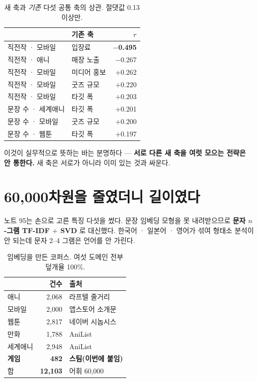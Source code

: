 \documentclass[10pt]{article}
\begin{document}
\begin{table}[t]
\centering\tsize
\caption{새 축과 \emph{기존} 다섯 공통 축의 상관. 절댓값 0.13 이상만.}
\begin{tabular}{llr}
\toprule
& 기존 축 & $r$ \\
\midrule
직전작 · 모바일 & 입장료 & \textbf{$-$0.495} \\
직전작 · 애니 & 매장 노출 & $-$0.267 \\
직전작 · 모바일 & 미디어 홍보 & $+$0.262 \\
직전작 · 모바일 & 굿즈 규모 & $+$0.220 \\
직전작 · 모바일 & 타깃 폭 & $+$0.203 \\
문장 수 · 세계애니 & 타깃 폭 & $+$0.201 \\
문장 수 · 모바일 & 굿즈 규모 & $+$0.200 \\
문장 수 · 웹툰 & 타깃 폭 & $+$0.197 \\
\bottomrule
\end{tabular}
\end{table}


이것이 실무적으로 뜻하는 바는 분명하다 --- \textbf{서로 다른 새 축을 여럿
모으는 전략은 안 통한다.} 새 축은 서로가 아니라 이미 있는 것과 싸운다.

\section{60,000차원을 줄였더니 길이였다}

노트 95는 손으로 고른 특징 다섯을 썼다. 문장 임베딩 모형을 못 내려받으므로
\textbf{문자 $n$-그램 TF-IDF $+$ SVD} 로 대신했다. 한국어 · 일본어 · 영어가
섞여 형태소 분석이 안 되는데 문자 2--4 그램은 언어를 안 가린다.

\begin{table}[t]
\centering\tsize
\caption{임베딩을 만든 코퍼스. 여섯 도메인 전부 덮개율 100\%.}
\begin{tabular}{lrl}
\toprule
& 건수 & 출처 \\
\midrule
애니 & 2,068 & 라프텔 줄거리 \\
모바일 & 2,000 & 앱스토어 소개문 \\
웹툰 & 2,817 & 네이버 시놉시스 \\
만화 & 1,788 & AniList \\
세계애니 & 2,948 & AniList \\
\textbf{게임} & \textbf{482} & \textbf{스팀(이번에 붙임)} \\
\midrule
합 & \textbf{12,103} & 어휘 60,000 \\
\bottomrule
\end{tabular}
\end{table}
\end{document}

